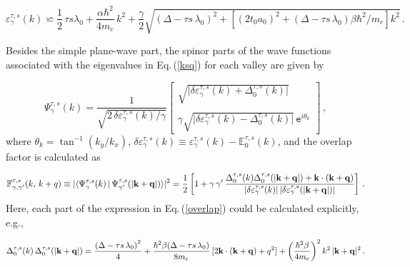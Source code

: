 \documentclass[aps,prb,showpacs]{revtex4}
\newcommand{\mbb}{\mathbb}
\newcommand{\tet}{\texttt}
\begin{document}
\begin{equation}
\varepsilon^{\tau,s}_{\gamma}(k)\backsimeq \frac{1}{2}\,\tau s\lambda_0 + \frac{\alpha\hbar^2}{4 m_e}\,k^2 + 
\frac{\gamma}{2}
\sqrt{
\left( \Delta - \tau s \, \lambda_0 \right)^2 + 
\left[
(2t_0a_0)^2+\left( \Delta - \tau s \, \lambda_0  \right)  \beta\hbar^2 / m_e
\right] k^2}\, .
\label{ksq}
\end{equation}
\medskip

Besides the simple plane-wave part, the spinor parts of the wave functions associated with the eigenvalues in Eq.\,(\ref{ksq}) for each valley are given by

\begin{equation}
\Psi^{\tau,s}_{\gamma}(k) =\frac{1}{\sqrt{2 \, \delta\varepsilon^{\tau,s}_{\gamma}(k)/ \gamma } } \left[
\begin{array}{c}
\sqrt{ \vert \delta\varepsilon^{\tau,s}_{\gamma}(k) + \Delta_0^{\tau,s}(k) \vert} \\
\\
\gamma\sqrt{ \vert \delta\varepsilon^{\tau,s}_{\gamma}(k)- \Delta_0^{\tau,s}(k) \vert} \, \tet{e}^{i\theta_k}
\end{array}
\right] \, ,
\label{wfunc}
\end{equation}
where $\theta_k =\tan^{-1}(k_y/k_x)$, $\delta\varepsilon^{\tau,s}_{\gamma}(k)\equiv\varepsilon^{\tau,s}_{\gamma}(k)-\mbb{E}_0^{\tau,s}(k)$,
and the overlap factor is calculated as

\begin{equation}
\mbb{F}^{\tau,s}_{\gamma,\gamma'}(k,\,k+q) \equiv \vert  \langle \Psi^{\tau,s}_{\gamma}(k) \, \vert \,
\Psi^{\tau,s}_{\gamma'}(\vert {\bf k} + {\bf q} \vert) \rangle \vert^2 =\frac{1}{2} \left[
1+ \gamma\,\gamma'\,\frac{\Delta_0^{\tau,s}(k)\Delta_0^{\tau,s}(\vert {\bf k} + {\bf q} \vert)  + { \bf k} \cdot ( {\bf k} + {\bf q})}{
\vert \delta\varepsilon^{\tau,s}_{\gamma}(k)\vert \, \vert \delta\varepsilon^{\tau,s}_{\gamma}(\vert {\bf k} + {\bf q} \vert) \vert}
\right]\, .
\label{overlap}
\end{equation}
Here, each part of the expression in Eq.\,(\ref{overlap}) could be calculated explicitly, e.g.,

\begin{equation}
\Delta_0^{\tau,s}(k) \, \Delta_0^{\tau,s}(\vert {\bf k} + {\bf q} \vert) = \frac{\left( \Delta - \tau s \, \lambda_0 \right)^2}{4} + 
\frac{\hbar^2 \beta(\Delta - \tau s \, \lambda_0)}{8 m_e} \, [2 { \bf k} \cdot ({\bf k} + {\bf q}) + q^2]
+\left(\frac{\hbar^2  \beta}{4 m_e}\right)^2 k^2 \,\vert{\bf k} + {\bf q} \vert^2 \, .
\end{equation}
\medskip
\end{document}
